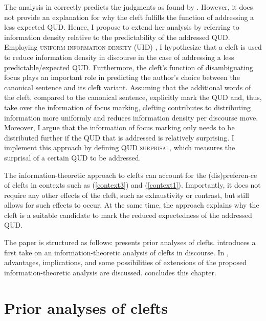 \documentclass[output=paper,colorlinks,citecolor=brown]{langscibook}
\begin{document}
The analysis in \citet{tonnis_2021} correctly predicts the judgments as found by \citet{tonnis_tonhauser_2022}.  However, it does not provide an explanation for why the cleft fulfills the function of addressing a less expected QUD. Hence, I propose to extend her analysis by referring to information density \citep[e.g.,][]{shannon_1948,levy_jaeger_2007} relative to the predictability of the addressed QUD. Employing \textsc{uniform information density} (UID) \citep[e.g.,][]{jaeger_2010}, I hypothesize that a cleft is used to reduce information density in discourse in the case of addressing a less predictable/expected QUD. Furthermore, the cleft's function of disambiguating focus \citep[as claimed by, e.g.,][]{deveaugh-geiss_et_al_2015,tonnis_et_al_2018} plays an important role in predicting the author's choice between the canonical sentence and its cleft variant. Assuming that the additional words of the cleft, compared to the canonical sentence, explicitly mark the QUD and, thus, take over the information of focus marking, clefting contributes to distributing information more uniformly and reduces information density per discourse move. Moreover, I argue that the information of focus marking only needs to be distributed further if the QUD that is addressed is relatively surprising. I implement this approach by defining \textsc{QUD surprisal}, which measures the surprisal of a certain QUD to be addressed. 

The information-theoretic approach to clefts can account for the (dis)preferen-ce of clefts in contexts such as (\ref{context3}) and (\ref{context1}). Importantly, it does not require any other effects of the cleft, such as exhaustivity or contrast, but still allows for such effects to occur. At the same time, the approach explains why the cleft is a suitable candidate to mark the reduced expectedness of the addressed QUD. 

The paper is structured as follows:  presents prior analyses of clefts.  introduces a first take on an information-theoretic analysis of clefts in discourse. In , advantages, implications, and some possibilities of extensions of the proposed information-theoretic analysis are discussed.  concludes this chapter.



\section{Prior analyses of clefts}\label{sec:prior}
\end{document}
